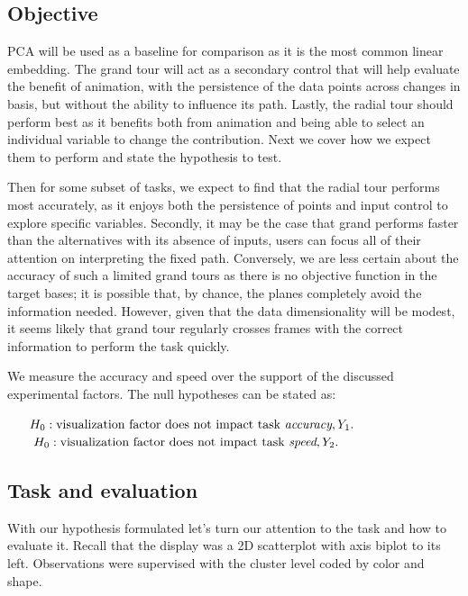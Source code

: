 \documentclass{template/monashthesis}
\begin{document}
\hypertarget{sec:objective}{%
\subsection{Objective}\label{sec:objective}}

PCA will be used as a baseline for comparison as it is the most common linear embedding. The grand tour will act as a secondary control that will help evaluate the benefit of animation, with the persistence of the data points across changes in basis, but without the ability to influence its path. Lastly, the radial tour should perform best as it benefits both from animation and being able to select an individual variable to change the contribution. Next we cover how we expect them to perform and state the hypothesis to test.

Then for some subset of tasks, we expect to find that the radial tour performs most accurately, as it enjoys both the persistence of points and input control to explore specific variables. Secondly, it may be the case that grand performs faster than the alternatives with its absence of inputs, users can focus all of their attention on interpreting the fixed path. Conversely, we are less certain about the accuracy of such a limited grand tours as there is no objective function in the target bases; it is possible that, by chance, the planes completely avoid the information needed. However, given that the data dimensionality will be modest, it seems likely that grand tour regularly crosses frames with the correct information to perform the task quickly.

We measure the accuracy and speed over the support of the discussed experimental factors. The null hypotheses can be stated as:

\(~~~~~H_0: \text{visualization factor does not impact task } \textit{accuracy}, Y_1. \\\)
\(~~~~~~H_0: \text{visualization factor does not impact task } \textit{speed}, Y_2. \\\)

\hypertarget{sec:task}{%
\subsection{Task and evaluation}\label{sec:task}}

With our hypothesis formulated let's turn our attention to the task and how to evaluate it.
Recall that the display was a 2D scatterplot with axis biplot to its left. Observations were supervised with the cluster level coded by color and shape.
\end{document}
